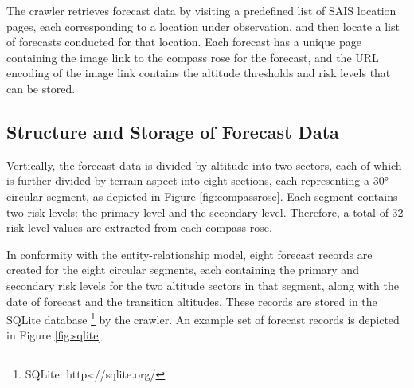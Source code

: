 \documentclass[11pt, oneside]{article}
\begin{document}
		The crawler retrieves forecast data by visiting a predefined list of SAIS location pages, each corresponding to a location under observation, and then locate a list of forecasts conducted for that location. Each forecast has a unique page containing the image link to the compass rose for the forecast, and the URL encoding of the image link contains the altitude thresholds and risk levels that can be stored. 
		
	\subsection{Structure and Storage of Forecast Data}
	
		Vertically, the forecast data is divided by altitude into two sectors, each of which is further divided by terrain aspect into eight sections, each representing a 30\si{\degree} circular segment, as depicted in Figure \ref{fig:compassrose}. Each segment contains two risk levels: the primary level and the secondary level. Therefore, a total of 32 risk level values are extracted from each compass rose. 
		
		In conformity with the entity-relationship model, eight forecast records are created for the eight circular segments, each containing the primary and secondary risk levels for the two altitude sectors in that segment, along with the date of forecast and the transition altitudes. These records are stored in the SQLite database \footnote{SQLite: https://sqlite.org/} by the crawler. An example set of forecast records is depicted in Figure \ref{fig:sqlite}.
		
\end{document}
